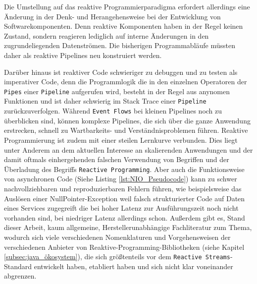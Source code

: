 Die Umstellung auf das reaktive Programmierparadigma erfordert allerdings eine Änderung in der Denk- und Herangehensweise bei der
Entwicklung von Softwarekomponenten. Denn reaktive Komponenten haben in der Regel keinen Zustand,
sondern reagieren lediglich auf interne Änderungen in den zugrundeliegenden Datenströmen.
Die bisherigen Programmabläufe müssten daher als reaktive Pipelines neu konstruiert werden.

Darüber hinaus ist reaktiver Code schwieriger zu debuggen und zu testen als imperativer Code, denn die Programmlogik die in den einzelnen Operatoren
der \verb|Pipes| einer \verb|Pipeline| aufgerufen wird, besteht in der Regel aus anynomen Funktionen und ist daher schwierig im Stack Trace einer
\verb|Pipeline| zurückzuverfolgen.
Während \verb|Event Flows| bei kleinen Pipelines noch zu überblicken sind, können komplexe Pipelines, die sich über die ganze Anwendung erstrecken,
schnell zu Wartbarkeits- und Verständnisproblemen führen.
Reaktive Programmierung ist zudem mit einer steilen Lernkurve verbunden. Dies liegt unter Anderem an dem aktuellen Interesse an skalierenden
Anwendungen und der damit oftmals einhergehenden falschen Verwendung von Begriffen und der Überladung des Begriffs \verb|Reactive Programming|.
Aber auch die Funktionsweise von asynchronen Code (Siehe Listing \ref{lst:NIO_Pseudocode}) kann zu schwer nachvollziehbaren und
reproduzierbaren Fehlern führen, wie beispielsweise das Auslösen einer NullPointer-Exception weil falsch strukturierter Code
auf Daten eines Services zugegreift die bei hoher Latenz zur Ausführungszeit noch nicht vorhanden sind, bei niedriger Latenz
allerdings schon.
Außerdem gibt es, Stand dieser Arbeit, kaum allgemeine, Herstellerunabhängige Fachliteratur zum Thema, wodurch sich viele verschiedenen Nomenklaturen und Vorgehensweisen der verschiedenen Anbieter von
Reaktive-Programming-Bibliotheken (siehe Kapitel \ref{subsec:java_ökosystem}), die sich größtenteils vor dem \verb|Reactive Streams|-Standard entwickelt haben, etabliert haben
und sich nicht klar voneinander abgrenzen.

